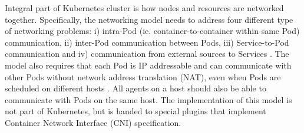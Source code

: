 \documentclass[english,12pt,a4paper,pdftex,sci,utf8]{aaltothesis}
\begin{document}

Integral part of Kubernetes cluster is how nodes and resources are networked together. Specifically, the networking model needs to address four different type of networking problems: i) intra-Pod (ie. container-to-container within same Pod) communication, ii) inter-Pod communication between Pods, iii) Service-to-Pod communication and iv) communication from external sources to Services \cite{k8s-docs-cluster-networking}. The model also requires that each Pod is IP addressable and can communicate with other Pods without network address translation (NAT), even when Pods are scheduled on different hosts \cite{qi2020assessing}. All agents on a host should also be able to communicate with Pods on the same host. The implementation of this model is not part of Kubernetes, but is handed to special plugins that implement Container Network Interface (CNI) specification.




\end{document}
